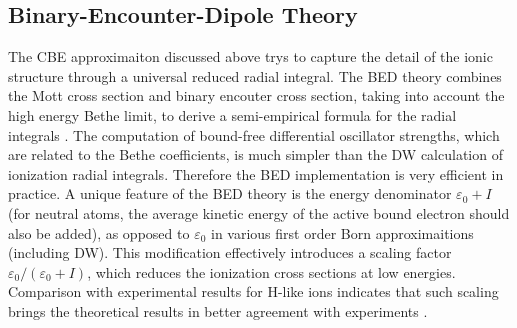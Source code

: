 \documentclass[preprint, floatfix, pra, showpacs, showkeys]{revtex4}
\begin{document}
\subsection{Binary-Encounter-Dipole Theory}
The CBE approximaiton discussed above trys to capture the detail of the ionic
structure through a universal reduced radial integral. The BED theory
combines the Mott cross section and binary encouter cross section, taking into
account the high energy Bethe limit, to derive a semi-empirical formula for
the radial integrals \cite{kim94}. The computation of bound-free differential
oscillator strengths, which are related to the Bethe coefficients, is much
simpler than the DW calculation of ionization radial integrals. Therefore the
BED implementation is very efficient in practice. A unique feature of the BED
theory is the energy denominator $\varepsilon_0+I$ (for neutral atoms, the
average kinetic energy of the active bound electron should also be added), as
opposed to $\varepsilon_0$ in various first order Born approximaitions
(including DW). This modification effectively introduces a scaling factor
$\varepsilon_0/(\varepsilon_0+I)$, which reduces the ionization cross sections
at low energies. Comparison with experimental results for H-like ions
indicates that such scaling brings the theoretical results in better
agreement with experiments \cite{kim94}.
\end{document}
